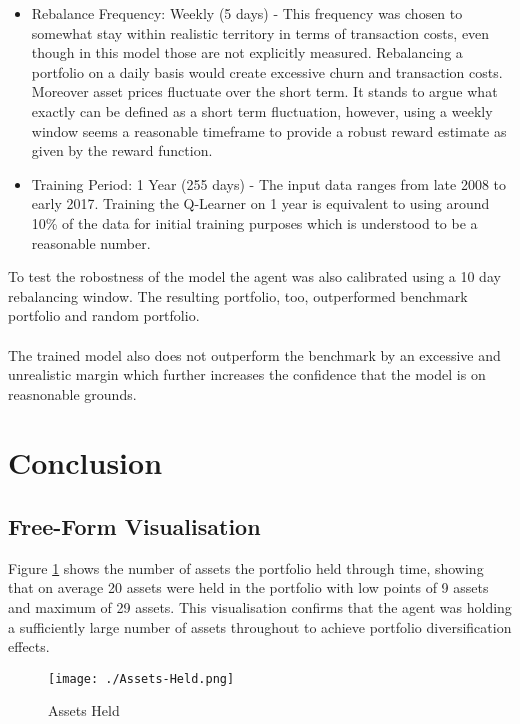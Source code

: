 \documentclass[dvips,12pt]{article}
\begin{document}
\begin{itemize}
	\item Rebalance Frequency: Weekly (5 days) - This frequency was chosen to somewhat stay within realistic territory in terms of transaction costs, even though in this model those are not explicitly measured. Rebalancing a portfolio on a daily basis would create excessive churn and transaction costs. Moreover asset prices fluctuate over the short term. It stands to argue what exactly can be defined as a short term fluctuation, however, using a weekly window seems a reasonable timeframe to provide a robust reward estimate as given by the reward function.
	
	\item Training Period: 1 Year (255 days) - The input data ranges from late 2008 to early 2017. Training the Q-Learner on 1 year is equivalent to using around 10\% of the data for initial training purposes which is understood to be a reasonable number.
\end{itemize}

To test the robostness of the model the agent was also calibrated using a 10 day rebalancing window. The resulting portfolio, too, outperformed benchmark portfolio and random portfolio.
\\\\
The trained model also does not outperform the benchmark by an excessive and unrealistic margin which further increases the confidence that the model is on reasnonable grounds.

\section{Conclusion}
\subsection{Free-Form Visualisation}
Figure \ref{fig:assets_held} shows the number of assets the portfolio held through time, showing that on average 20 assets were held in the portfolio with low points of 9 assets and maximum of 29 assets. This visualisation confirms that the agent was holding a sufficiently large number of assets throughout to achieve portfolio diversification effects.

\begin{figure}
  \texttt{[image: ./Assets-Held.png]}
  \caption{Assets Held}
  \label{fig:assets_held}
\end{figure}
\end{document}
